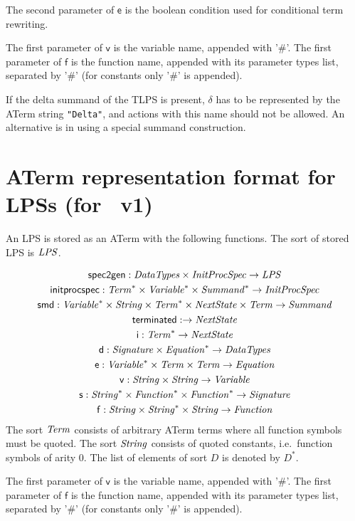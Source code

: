 \documentclass[fleqn,a4paper]{article}
\newcommand{\aterm}[1]{\mathsf{#1}}
\newcommand{\afunc}[3]{\aterm{#1}:#2\rightarrow#3}
\begin{document}
The second parameter of $\mathsf{e}$ is the boolean condition used for
conditional term rewriting.

The first parameter of $\mathsf{v}$ is the variable name, appended with '\#'.
The first parameter of $\mathsf{f}$ is the function name, appended
with its parameter types list, separated by '\#' (for constants only '\#' is appended).

If the delta summand of the TLPS is present, $\delta$ has to be
represented by the ATerm string \texttt{"Delta"}, and actions with
this name should not be allowed.  An alternative is in using a special
summand construction.

\newpage
\section{ATerm representation format for LPSs (for \mcrl\ v1)}
An LPS is stored as an ATerm with the following functions. The sort
of stored LPS is $\mathit{LPS}$.

\begin{gather*}
\afunc{spec2gen}{\nm{DataTypes}\x\nm{InitProcSpec}}{\nm{LPS}}\\
\afunc{initprocspec}{\nm{Term}^*\x\nm{Variable}^*\x\nm{Summand}^*}{\nm{InitProcSpec}}\\
\afunc{smd}{\nm{Variable}^*\x\nm{String}\x\nm{Term}^*\x\nm{NextState}\x\nm{Term}}{\nm{Summand}}\\
\afunc{terminated}{}{\nm{NextState}}\\
\afunc{i}{\nm{Term}^*}{\nm{NextState}}\\
\afunc{d}{\nm{Signature}\x\nm{Equation}^*}{\nm{DataTypes}}\\
\afunc{e}{\nm{Variable}^*\x\nm{Term}\x\nm{Term}}{\nm{Equation}}\\
\afunc{v}{\nm{String}\x\nm{String}}{\nm{Variable}}\\
\afunc{s}{\nm{String}^*\x\nm{Function}^*\x\nm{Function}^*}{\nm{Signature}}\\
\afunc{f}{\nm{String}\x\nm{String}^{*}\x\nm{String}}{\nm{Function}}
\end{gather*}
The sort $\mathit{Term}$ consists of arbitrary ATerm terms where all function
symbols must be quoted. The sort $\mathit{String}$ consists of quoted constants,
i.e.\ function symbols of arity 0. The list
of elements of sort $D$ is denoted by $D^{*}$.

The first parameter of $\mathsf{v}$ is the variable name, appended with '\#'.
The first parameter of $\mathsf{f}$ is the function name, appended
with its parameter types list, separated by '\#' (for constants only '\#' is appended).
\end{document}
